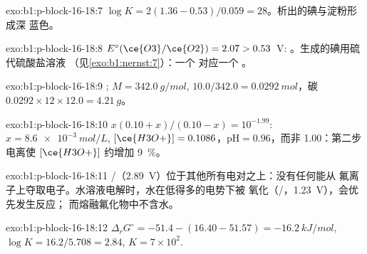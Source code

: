 \begin{solution}{exo:b1:p-block-16-18:7}
$\log K = 2(1.36 - 0.53)/0.059 = 28$。析出的碘与淀粉形成深
蓝色。
\end{solution}

\begin{solution}{exo:b1:p-block-16-18:8}
$E^\circ(\ce{O3}/\ce{O2}) = 2.07 > 0.53$~V: 。生成的碘用硫代硫酸盐溶液
（见\cref{exo:b1:nernst:7}）：一个  对应一个 。
\end{solution}

\begin{solution}{exo:b1:p-block-16-18:9}
; $M = \qty{342.0}{g/mol}$, $10.0/342.0 =
\qty{0.0292}{mol}$，碳 $0.0292 \times 12 \times 12.0 = \qty{4.21}{g}$。
\end{solution}

\begin{solution}{exo:b1:p-block-16-18:10}
$x(0.10 + x)/(0.10 - x) = 10^{-1.99}$: $x = \qty{8.6e-3}{mol/L}$,
$[\ce{H3O+}] = 0.1086$，$\mathrm{pH} = 0.96$，而非 1.00：第二步
电离使 $[\ce{H3O+}]$ 约增加 \qty{9}{\percent}。
\end{solution}

\begin{solution}{exo:b1:p-block-16-18:11}
/（2.89~V）位于其他所有电对之上：没有任何能从
氟离子上夺取电子。水溶液电解时，水在低得多的电势下被
氧化（/，1.23~V），会优先发生反应；
而熔融氟化物中不含水。
\end{solution}

\begin{solution}{exo:b1:p-block-16-18:12}
$\Delta_r G^\circ = -51.4 - (16.40 - 51.57) = \qty{-16.2}{kJ/mol}$,
$\log K = 16.2/5.708 = 2.84$, $K = 7 \times 10^2$.
\end{solution}


